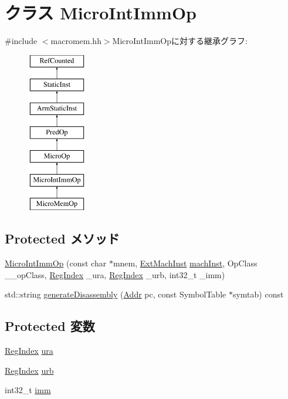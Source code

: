 \hypertarget{classArmISA_1_1MicroIntImmOp}{
\section{クラス MicroIntImmOp}
\label{classArmISA_1_1MicroIntImmOp}
}


{\ttfamily \#include $<$macromem.hh$>$}MicroIntImmOpに対する継承グラフ:\begin{figure}[H]
\begin{center}
\leavevmode
\includegraphics[height=7cm]{classArmISA_1_1MicroIntImmOp}
\end{center}
\end{figure}
\subsection*{Protected メソッド}
\begin{DoxyCompactItemize}
\item 
\hyperlink{classArmISA_1_1MicroIntImmOp_ac48b8ef4688144851e7cef3b098d573b}{MicroIntImmOp} (const char $\ast$mnem, \hyperlink{classStaticInst_a5605d4fc727eae9e595325c90c0ec108}{ExtMachInst} \hyperlink{classStaticInst_a744598b194ca3d4201d9414ce4cc4af4}{machInst}, OpClass \_\-\_\-opClass, \hyperlink{classStaticInst_a36d25e03e43fa3bb4c5482cbefe5e0fb}{RegIndex} \_\-ura, \hyperlink{classStaticInst_a36d25e03e43fa3bb4c5482cbefe5e0fb}{RegIndex} \_\-urb, int32\_\-t \_\-imm)
\item 
std::string \hyperlink{classArmISA_1_1MicroIntImmOp_a95d323a22a5f07e14d6b4c9385a91896}{generateDisassembly} (\hyperlink{classm5_1_1params_1_1Addr}{Addr} pc, const SymbolTable $\ast$symtab) const 
\end{DoxyCompactItemize}
\subsection*{Protected 変数}
\begin{DoxyCompactItemize}
\item 
\hyperlink{classStaticInst_a36d25e03e43fa3bb4c5482cbefe5e0fb}{RegIndex} \hyperlink{classArmISA_1_1MicroIntImmOp_a8e6cd3e234a4950e7a1a05f1b24cfee0}{ura}
\item 
\hyperlink{classStaticInst_a36d25e03e43fa3bb4c5482cbefe5e0fb}{RegIndex} \hyperlink{classArmISA_1_1MicroIntImmOp_a3771d4e6da84a09dbf436d6b1af2be46}{urb}
\item 
int32\_\-t \hyperlink{classArmISA_1_1MicroIntImmOp_a71f011dbd3228d41f9e08aaf8c133f77}{imm}
\end{DoxyCompactItemize}


